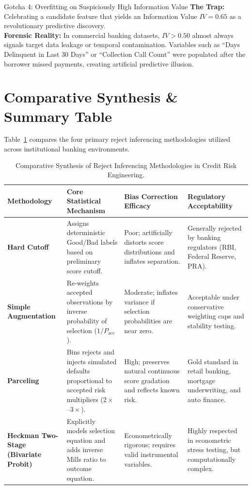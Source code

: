 \begin{trapbox}{Gotcha 4: Overfitting on Suspiciously High Information Value}
\textbf{The Trap:} Celebrating a candidate feature that yields an Information Value $IV = 0.65$ as a revolutionary predictive discovery.\\
\textbf{Forensic Reality:} In commercial banking datasets, $IV > 0.50$ almost always signals target data leakage or temporal contamination. Variables such as ``Days Delinquent in Last 30 Days'' or ``Collection Call Count'' were populated after the borrower missed payments, creating artificial predictive illusion.
\end{trapbox}

\section{Comparative Synthesis \& Summary Table}

Table~\ref{tab:comparison_reject_inferencing} compares the four primary reject inferencing methodologies utilized across institutional banking environments.

\begin{table}[htbp]
\centering
\small
\begin{tabularx}{\textwidth}{lXXX}
\toprule
\textbf{Methodology} & \textbf{Core Statistical Mechanism} & \textbf{Bias Correction Efficacy} & \textbf{Regulatory Acceptability} \\
\midrule
\textbf{Hard Cutoff} & Assigns deterministic Good/Bad labels based on preliminary score cutoff. & Poor; artificially distorts score distributions and inflates separation. & Generally rejected by banking regulators (RBI, Federal Reserve, PRA). \\
\addlinespace
\textbf{Simple Augmentation} & Re-weights accepted observations by inverse probability of selection ($1/P_{\text{acc}}$). & Moderate; inflates variance if selection probabilities are near zero. & Acceptable under conservative weighting caps and stability testing. \\
\addlinespace
\textbf{Parceling} & Bins rejects and injects simulated defaults proportional to accepted risk multipliers ($2\times$--$3\times$). & High; preserves natural continuous score gradation and reflects known risk. & Gold standard in retail banking, mortgage underwriting, and auto finance. \\
\addlinespace
\textbf{Heckman Two-Stage (Bivariate Probit)} & Explicitly models selection equation and adds inverse Mills ratio to outcome equation. & Econometrically rigorous; requires valid instrumental variables. & Highly respected in econometric stress testing, but computationally complex. \\
\bottomrule
\end{tabularx}
\caption{Comparative Synthesis of Reject Inferencing Methodologies in Credit Risk Engineering.}
\label{tab:comparison_reject_inferencing}
\end{table}

